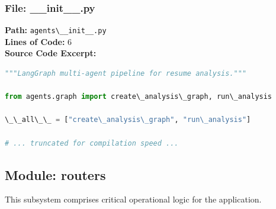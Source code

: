 \documentclass[10pt,journal,compsoc]{IEEEtran}
\begin{document}
\subsubsection{File: \_\_init\_\_.py}
\textbf{Path:} \texttt{agents\textbackslash{}\_\_init\_\_.py} \\
\textbf{Lines of Code:} 6 \\
\textbf{Source Code Excerpt:}
\begin{lstlisting}[language=Python]
"""LangGraph multi-agent pipeline for resume analysis."""

from agents.graph import create\_analysis\_graph, run\_analysis

\_\_all\_\_ = ["create\_analysis\_graph", "run\_analysis"]

# ... truncated for compilation speed ...
\end{lstlisting}

\subsection{Module: routers}
This subsystem comprises critical operational logic for the application.
\end{document}
